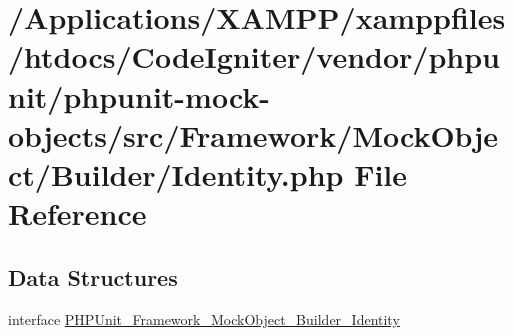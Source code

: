 \hypertarget{_identity_8php}{}\section{/\+Applications/\+X\+A\+M\+P\+P/xamppfiles/htdocs/\+Code\+Igniter/vendor/phpunit/phpunit-\/mock-\/objects/src/\+Framework/\+Mock\+Object/\+Builder/\+Identity.php File Reference}
\label{_identity_8php}
\subsection*{Data Structures}
\begin{DoxyCompactItemize}
\item 
interface \mbox{\hyperlink{interface_p_h_p_unit___framework___mock_object___builder___identity}{P\+H\+P\+Unit\+\_\+\+Framework\+\_\+\+Mock\+Object\+\_\+\+Builder\+\_\+\+Identity}}
\end{DoxyCompactItemize}
